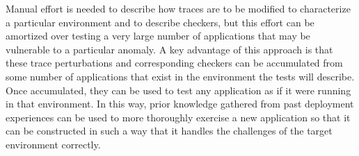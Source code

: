 Manual effort is needed to describe how traces are to be modified to
characterize a particular environment and to describe checkers, but
this effort can be amortized over testing a very large number of
applications that may be vulnerable to a particular anomaly.
%
%
%
A key advantage of this approach is that these %
trace perturbations and corresponding checkers can be
accumulated from some number of applications that exist in the environment the tests will describe.  Once accumulated,
they can be used to test any application as if it were running in that environment.  In this way, prior knowledge
gathered from past deployment experiences can be used to more thoroughly exercise a new application so that it can be
constructed in such a way that it handles the challenges of the target environment correctly.

